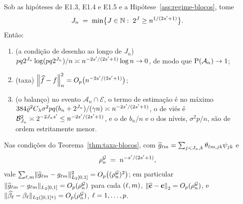 \documentclass[11pt,a4paper]{article}
\newcommand{\bn}{b_{n}}
\newcommand{\rhoG}{\rho^{\mathcal{G}}_{n}}
\newcommand{\Ecal}{\mathcal{E}}
\newcommand{\Acal}{\mathcal{A}_{n}}
\begin{document}
\begin{theorem}\label{thm:taxa-blocos}
Sob as hipóteses de E1.3, E1.4 e E1.5 e a Hipótese~\ref{ass:regime-blocos},
tome
\begin{equation}
  \label{eq:Jn-blocos}
  J_{n} \;=\; \min\bigl\{J \in \mathbb{N} :\; 2^{J} \ge n^{1/(2s'+1)}\bigr\}.
\end{equation}
Então:
\begin{enumerate}[label=\textup{(\roman*)}, leftmargin=*]
  \item \textup{(a condição de desenho ao longo de $J_{n}$)}
    $pq2^{J_{n}}\log(pq2^{J_{n}})/n \asymp n^{-2s'/(2s'+1)}\log n \to 0$,
    de modo que $\Prob(\Acal) \to 1$;
  \item \textup{(taxa)}
    $\left\lVert \widehat f - f \right\rVert_{n}^{2} = O_{p}\bigl(n^{-2s'/(2s'+1)}\bigr)$;
  \item \textup{(o balanço)} no evento $\Acal \cap \Ecal$, o termo de estimação
    é no máximo $384\bar\varrho^{2}C_{\pen}\sigma^{2}pq(\bn + 2^{J_{n}})/(\gamma n)
    \asymp n^{-2\seff/(2\seff+1)}$, o de viés é $\mathcal{B}_{J_{n}}^{2}
    \asymp 2^{-2J_{n}s'} \le n^{-2s'/(2s'+1)}$, e o de
    $\bn/n$ e o dos níveis, $\sigma^{2}p/n$, são de ordem estritamente menor.
\end{enumerate}
\end{theorem}

\begin{corollary}\label{cor:componentes-blocos}
Nas condições do Teorema~\ref{thm:taxa-blocos}, com
$\widehat g_{\ell m} = \sum_{j<J_{n},k}\theta_{\ell m,jk}
\psi_{jk}$ e
\[
  \rhoG \;=\; n^{-\seff/(2\seff+1)},
\]
vale $\sum_{\cv,\md}\lVert\widehat g_{\cv\md} -
\gcomp{\cv}{\md}\rVert_{L_{2}[0,1]}^{2} = O_{p}\bigl((\rhoG)^{2}\bigr)$; em
particular $\lVert\widehat g_{\cv\md} - \gcomp{\cv}{\md}\rVert_{L_{2}[0,1]} =
O_{p}(\rhoG)$ para cada $(\ell,m)$, $\norm{\chat - \bc}_{2} = O_{p}(\rhoG)$,
e $\lVert\widehat{\fcoef{\cv}} - \fcoef{\cv}\rVert_{L_{2}([0,1]^{q})} =
O_{p}(\rhoG)$, $\ell = 1,\dots,p$.
\end{corollary}
\end{document}
